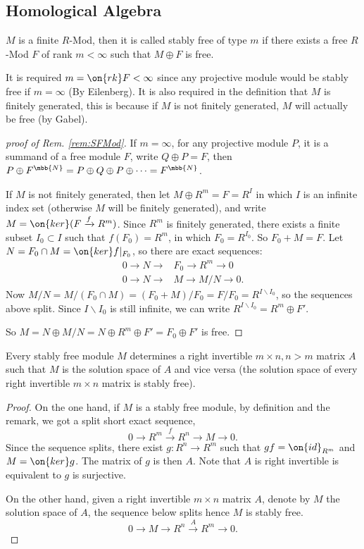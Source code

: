 \subsection{Homological Algebra}
\begin{dfn}
	$M$ is a finite $R$-Mod, then it is called stably free of type $m$ if there exists a free $R$-Mod $F$ of rank $m<\infty$ such that $M\oplus F$ is free.
\end{dfn}
\begin{rmk}\label{rem:SFMod}
	It is required $m=\on{rk}F<\infty$ since any projective module would be stably free if $m=\infty$ (By Eilenberg). It is also required in the definition that $M$ is finitely generated, this is because if $M$ is not finitely generated, $M$ will actually be free (by Gabel).
\end{rmk}
\begin{proof}[proof of Rem. \ref{rem:SFMod}]
	If $m=\infty$, for any projective module $P$, it is a summand of a free module $F$, write $Q\oplus P = F$, then $P\oplus F^{\mbb{N}} = P\oplus Q\oplus P\oplus\cdots = F^{\mbb{N}}$.
	
	If $M$ is not finitely generated, then let $M\oplus R^m=F=R^I$ in which $I$ is an infinite index set (otherwise $M$ will be finitely generated), and write $M=\on{ker}(F\xrightarrow{f} R^m)$. Since $R^m$ is finitely generated, there exists a finite subset $I_0\subset I$ such that $f(F_0)=R^m$, in which $F_0=R^{I_0}$. So $F_0+M=F$. Let $N=F_0\cap M=\on{ker}f|_{F_0}$, so there are exact sequences:
	\begin{align*}
		0\rightarrow N\rightarrow &F_0\rightarrow R^m\rightarrow 0\\
		0\rightarrow N\rightarrow &M\rightarrow M/N\rightarrow 0.
	\end{align*}
	Now $M/N=M/(F_0\cap M) = (F_0+M)/F_0 = F/F_0=R^{I\backslash I_0}$, so the sequences above split. Since $I\backslash I_0$ is still infinite, we can write $R^{I\backslash I_0}=R^m\oplus F'$.
	
	So $M=N\oplus M/N=N\oplus R^m\oplus F'=F_0\oplus F'$ is free.
\end{proof}

\begin{prp}
	Every stably free module $M$ determines a right invertible $m\times n, n>m$ matrix $A$ such that $M$ is the solution space of $A$ and vice versa (the solution space of every right invertible $m\times n$ matrix is stably free).
\end{prp}
\begin{proof}
	On the one hand, if $M$ is a stably free module, by definition and the remark, we got a split short exact sequence,
	$$
	0\rightarrow R^m\xrightarrow{f} R^n\rightarrow M\rightarrow 0.
	$$
	Since the sequence splits, there exist $g:R^n\rightarrow R^m$ such that $gf=\on{id}_{R^m}$ and $M=\on{ker}g$. The matrix of $g$ is then $A$. Note that $A$ is right invertible is equivalent to $g$ is surjective.
	
	On the other hand, given a right invertible $m\times n$ matrix $A$, denote by $M$ the solution space of $A$, the sequence below splits hence $M$ is stably free.
	$$
	0\rightarrow M\rightarrow R^n\xrightarrow{A} R^m\rightarrow 0.
	$$
\end{proof}

